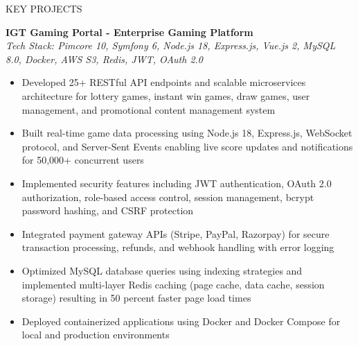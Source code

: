 \documentclass{resume} %
\begin{document}

\begin{rSection}{KEY PROJECTS}

\textbf{IGT Gaming Portal - Enterprise Gaming Platform}\\
\textit{Tech Stack: Pimcore 10, Symfony 6, Node.js 18, Express.js, Vue.js 2, MySQL 8.0, Docker, AWS S3, Redis, JWT, OAuth 2.0}
\begin{itemize}
    \itemsep -3pt {}
    \item Developed 25+ RESTful API endpoints and scalable microservices architecture for lottery games, instant win games, draw games, user management, and promotional content management system
    \item Built real-time game data processing using Node.js 18, Express.js, WebSocket protocol, and Server-Sent Events enabling live score updates and notifications for 50,000+ concurrent users
    \item Implemented security features including JWT authentication, OAuth 2.0 authorization, role-based access control, session management, bcrypt password hashing, and CSRF protection
    \item Integrated payment gateway APIs (Stripe, PayPal, Razorpay) for secure transaction processing, refunds, and webhook handling with error logging
    \item Optimized MySQL database queries using indexing strategies and implemented multi-layer Redis caching (page cache, data cache, session storage) resulting in 50 percent faster page load times
    \item Deployed containerized applications using Docker and Docker Compose for local and production environments
\end{itemize}

\vspace{0.5em}


\end{rSection}
\end{document}

